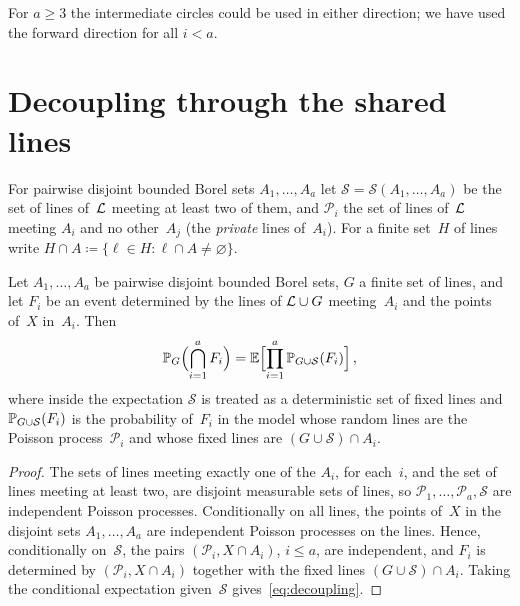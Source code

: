 \documentclass[11pt,letterpaper]{article}
\newcommand{\cS}{\mathcal S}
\begin{document}
For $a\ge3$ the intermediate circles could be used in either direction; we have used the forward direction for all $i<a$.

\section{Decoupling through the shared lines}
\label{sec:decoupling}

For pairwise disjoint bounded Borel sets $A_1,\dots,A_a$ let $\cS=\cS(A_1,\dots,A_a)$ be the set of lines of~$\mathcal L$ meeting at least two of them, and $\mathcal P_i$ the set of lines of~$\mathcal L$ meeting $A_i$ and no other~$A_j$ (the \emph{private} lines of~$A_i$). For a finite set~$H$ of lines write $H\cap A\coloneqq\{\ell\in H\colon\ell\cap A\neq\varnothing\}$.

\begin{lemma}
\label{lem:decoupling}
Let $A_1,\dots,A_a$ be pairwise disjoint bounded Borel sets, $G$ a finite set of lines, and let $F_i$ be an event determined by the lines of $\mathcal L\cup G$ meeting~$A_i$ and the points of~$X$ in~$A_i$. Then
\begin{equation}
\label{eq:decoupling}
  \P_G\Bigl(\bigcap_{i=1}^aF_i\Bigr)=\E\Bigl[\prod_{i=1}^a\P_{G\cup\cS}(F_i)\Bigr]\,,
\end{equation}
where inside the expectation $\cS$ is treated as a deterministic set of fixed lines and $\P_{G\cup\cS}(F_i)$ is the probability of~$F_i$ in the model whose random lines are the Poisson process~$\mathcal P_i$ and whose fixed lines are $(G\cup\cS)\cap A_i$.
\end{lemma}

\begin{proof}
The sets of lines meeting exactly one of the $A_i$, for each~$i$, and the set of lines meeting at least two, are disjoint measurable sets of lines, so $\mathcal P_1,\dots,\mathcal P_a,\cS$ are independent Poisson processes. Conditionally on all lines, the points of~$X$ in the disjoint sets $A_1,\dots,A_a$ are independent Poisson processes on the lines. Hence, conditionally on~$\cS$, the pairs $(\mathcal P_i,X\cap A_i)$, $i\le a$, are independent, and $F_i$ is determined by $(\mathcal P_i,X\cap A_i)$ together with the fixed lines $(G\cup\cS)\cap A_i$. Taking the conditional expectation given~$\cS$ gives~\eqref{eq:decoupling}.
\end{proof}
\end{document}
